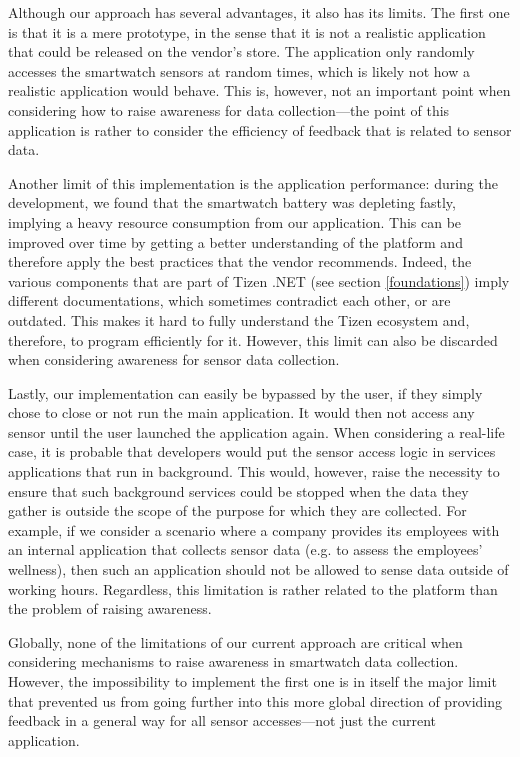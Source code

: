 \documentclass[conference, a4paper, 10pt, twocolumn]{IEEEtran}
\begin{document}
Although our approach has several advantages, it also has its limits. The first one is that it is a mere prototype, in the sense that it is not a realistic application that could be released on the vendor's store. The application only randomly accesses the smartwatch sensors at random times, which is likely not how a realistic application would behave. This is, however, not an important point when considering how to raise awareness for data collection---the point of this application is rather to consider the efficiency of feedback that is related to sensor data.  

Another limit of this implementation is the application performance: during the development, we found that the smartwatch battery was depleting fastly, implying a heavy resource consumption from our application. This can be improved over time by getting a better understanding of the platform and therefore apply the best practices that the vendor recommends. Indeed, the various components that are part of Tizen .NET (see section \ref{foundations}) imply different documentations, which sometimes contradict each other, or are outdated. This makes it hard to fully understand the Tizen ecosystem and, therefore, to program efficiently for it. However, this limit can also be discarded when considering awareness for sensor data collection.

Lastly, our implementation can easily be bypassed by the user, if they simply chose to close or not run the main application. It would then not access any sensor until the user launched the application again. When considering a real-life case, it is probable that developers would put the sensor access logic in services applications that run in background. This would, however, raise the necessity to ensure that such background services could be stopped when the data they gather is outside the scope of the purpose for which they are collected. For example, if we consider a scenario where a company provides its employees with an internal application that collects sensor data (e.g. to assess the employees' wellness), then such an application should not be allowed to sense data outside of working hours. Regardless, this limitation is rather related to the platform than the problem of raising awareness. 

Globally, none of the limitations of our current approach are critical when considering mechanisms to raise awareness in smartwatch data collection. However, the impossibility to implement the first one is in itself the major limit that prevented us from going further into this more global direction of providing feedback in a general way for all sensor accesses---not just the current application.
\end{document}
